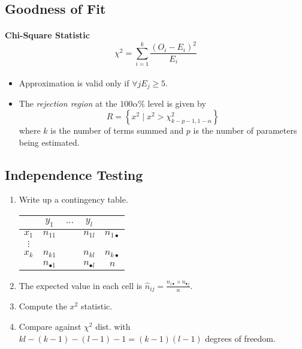 \documentclass[twocolumn,english]{article}
\providecommand{\tabularnewline}{\\}
\providecommand{\tabularnewline}{\\}
\begin{document}
\subsection{Goodness of Fit}

\paragraph{Chi-Square Statistic
\[
\chi^{2}=\sum_{i=1}^{k}\frac{\left(O_{i}-E_{i}\right)^{2}}{E_{i}}
\]
}
\begin{itemize}
\item Approximation is valid only if $\forall jE_{j}\geq5$.
\item The \emph{rejection region} at the $100\alpha\%$ level is given by
\[
R=\left\{ x^{2}\mid x^{2}>\chi_{k-p-1,1-\alpha}^{2}\right\} 
\]
where $k$ is the number of terms summed and $p$ is the number of
parameters being estimated.
\end{itemize}

\subsection{Independence Testing}
\begin{enumerate}
\item Write up a contingency table.
\begin{table}[H]
\centering{}%
\begin{tabular}{c|ccc|c}
 & $y_{1}$ & $\dots$ & $y_{l}$ & \tabularnewline
\hline 
$x_{1}$ & $n_{11}$ &  & $n_{1l}$ & $n_{1\bullet}$\tabularnewline
$\vdots$ &  &  &  & \tabularnewline
$x_{k}$ & $n_{k1}$ &  & $n_{kl}$ & $n_{k\bullet}$\tabularnewline
\hline 
 & $n_{\bullet1}$ &  & $n_{\bullet l}$ & $n$\tabularnewline
\end{tabular}
\end{table}
\item The expected value in each cell is $\hat{n}_{ij}=\frac{n_{i\bullet}\times n_{\bullet j}}{n}$.
\item Compute the $x^{2}$ statistic.
\item Compare against $\chi^{2}$ dist. with $kl-\left(k-1\right)-\left(l-1\right)-1=\left(k-1\right)\left(l-1\right)$
degrees of freedom.
\end{enumerate}
\end{document}
